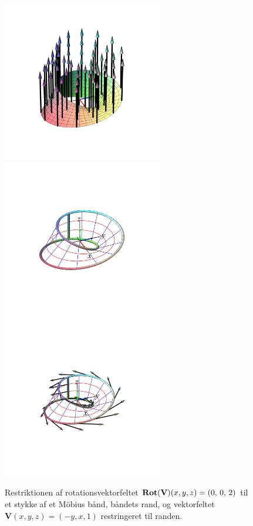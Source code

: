 \begin{figure}[h]
\centerline{\includegraphics[height=70mm]{FIGS/plotMobius4}\includegraphics[height=70mm]{FIGS/plotMobius5}\includegraphics[height=70mm]{FIGS/plotMobius6}}
\begin{center}
\caption{\small{Restriktionen af  rotationsvektorfeltet $\operatorname{\mathbf{Rot}}(\mathbf{V})(x,y,z)= (0, \, 0, \, 2)$ til et stykke af et M\"{o}bius bånd, båndets rand, og vektorfeltet $\mathbf{V}(x,y,z) = (-y, x, 1)$ restringeret til randen.}}
\label{figMob2}
\end{center}
\end{figure}




